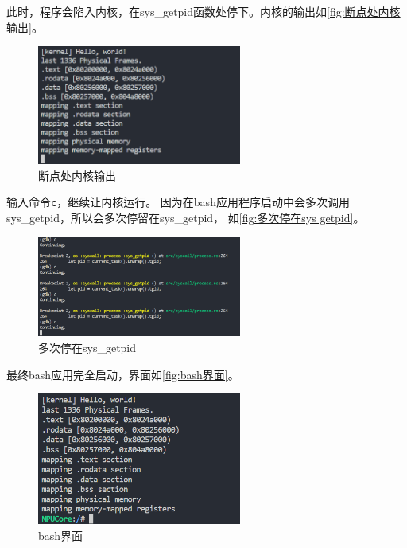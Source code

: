 此时，程序会陷入内核，在sys_getpid函数处停下。内核的输出如\autoref{fig:断点处内核输出}。

\begin{figure}[htb]
    \centering
    \includegraphics[width=0.6\textwidth]{figures/03-02-利用GDB跟踪getpid系统调用3.png}
    \caption{断点处内核输出}
    \label{fig:断点处内核输出}
\end{figure}


输入命令\lstinline`c`，继续让内核运行。
因为在bash应用程序启动中会多次调用sys_getpid，所以会多次停留在sys_getpid，
如\autoref{fig:多次停在sys getpid}。

\begin{figure}[htb]
    \centering
    \includegraphics[width=0.6\textwidth]{figures/03-02-利用GDB跟踪getpid系统调用4.png}
    \caption{多次停在sys_getpid}
    \label{fig:多次停在sys getpid}
\end{figure}

最终bash应用完全启动，界面如\autoref{fig:bash界面}。

\begin{figure}[htb]
    \centering
    \includegraphics[width=0.6\textwidth]{figures/03-02-利用GDB跟踪getpid系统调用5.png}
    \caption{bash界面}
    \label{fig:bash界面}
\end{figure}